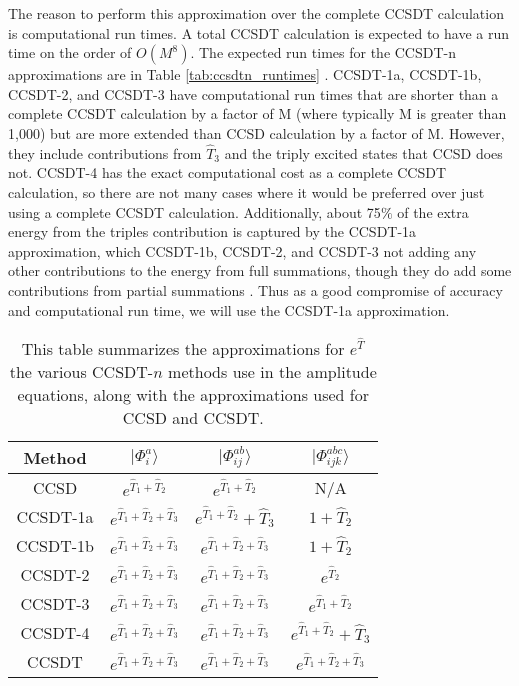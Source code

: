     The reason to perform this approximation over the complete CCSDT calculation is computational run times. A total CCSDT calculation is expected to have a run time on the order of $O(M^8)$. The expected run times for the CCSDT-n approximations are in Table \ref{tab:ccsdtn_runtimes} \cite{Ref155}. CCSDT-1a, CCSDT-1b, CCSDT-2, and CCSDT-3 have computational run times that are shorter than a complete CCSDT calculation by a factor of M (where typically M is greater than 1,000) but are more extended than CCSD calculation by a factor of M. However, they include contributions from $\hat{T}_3$ and the triply excited states that CCSD does not. CCSDT-4 has the exact computational cost as a complete CCSDT calculation, so there are not many cases where it would be preferred over just using a complete CCSDT calculation. Additionally, about 75$\%$ of the extra energy from the triples contribution is captured by the CCSDT-1a approximation, which CCSDT-1b, CCSDT-2, and CCSDT-3 not adding any other  contributions to the energy from full summations, though they do add some contributions from partial summations \cite{Ref155}. Thus as a good compromise of accuracy and computational run time, we will use the CCSDT-1a approximation.

    \begin{table}[H]
        \centering
        \begin{tabular}{|c|c|c|c|}\hline
            Method & $|\Phi^a_i\rangle $ & $|\Phi^{ab}_{ij}\rangle$ & $|\Phi_{ijk}^{abc}\rangle$ \\ \hline
             CCSD & $e^{\hat{T}_1 + \hat{T}_2}$ & $e^{\hat{T}_1 + \hat{T}_2}$ & N/A \\ \hline
             CCSDT-1a & $e^{\hat{T}_1 + \hat{T}_2 + \hat{T}_3}$ & $e^{\hat{T}_1 + \hat{T}_2} + \hat{T}_3$ & $ 1 + \hat{T}_2$ \\ \hline
             CCSDT-1b & $e^{\hat{T}_1 + \hat{T}_2 + \hat{T}_3}$ & $e^{\hat{T}_1 + \hat{T}_2 + \hat{T}_3}$ & $ 1 + \hat{T}_2$ \\ \hline
             CCSDT-2 & $e^{\hat{T}_1 + \hat{T}_2 + \hat{T}_3}$ & $e^{\hat{T}_1 + \hat{T}_2 + \hat{T}_3}$ & $e^{\hat{T}_2}$ \\ \hline
             CCSDT-3 & $e^{\hat{T}_1 + \hat{T}_2 + \hat{T}_3}$ & $e^{\hat{T}_1 + \hat{T}_2 + \hat{T}_3}$ & $e^{\hat{T}_1 + \hat{T}_2}$ \\ \hline
             CCSDT-4 & $e^{\hat{T}_1 + \hat{T}_2 + \hat{T}_3}$ & $e^{\hat{T}_1 + \hat{T}_2 + \hat{T}_3}$ & $e^{\hat{T}_1 + \hat{T}_2} + \hat{T}_3$ \\ \hline
             CCSDT & $e^{\hat{T}_1 + \hat{T}_2 + \hat{T}_3}$ & $e^{\hat{T}_1 + \hat{T}_2 + \hat{T}_3}$ & $e^{\hat{T}_1 + \hat{T}_2 + \hat{T}_3}$ \\ \hline
        \end{tabular}
        \caption{This table summarizes the approximations for $e^{\hat{T}}$ the various CCSDT-$n$ methods use in the amplitude equations, along with the approximations used for CCSD and CCSDT.}
        \label{tab:ccsdtn-projections}
    \end{table}

